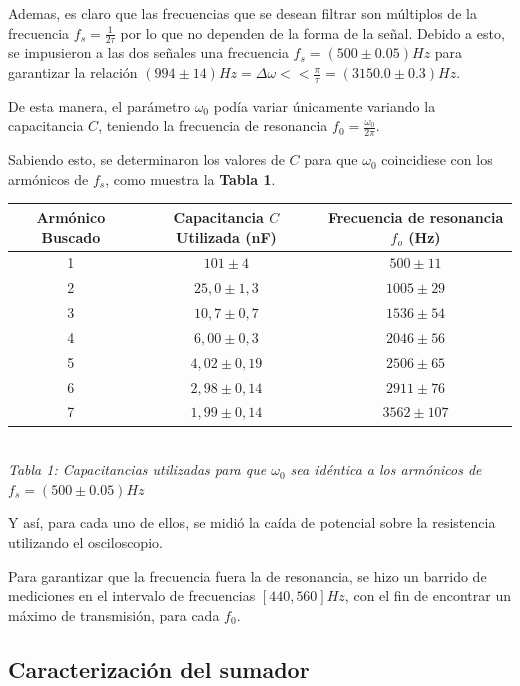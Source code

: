 \documentclass[11pt,a4paper]{article}
\begin{document}
Ademas, es claro que las frecuencias que se desean filtrar son múltiplos de la frecuencia $f_s = \frac{1}{2\tau}$ por lo que no dependen de la forma de la señal. Debido a esto, se impusieron a las dos señales una frecuencia $f_s = (500 \pm 0.05) Hz$ para garantizar la relación $(994\pm 14)Hz=\Delta\omega << \frac{\pi}{\tau} = (3150.0 \pm 0.3)Hz$.

De esta manera, el parámetro $\omega_0$ podía variar únicamente variando la capacitancia $C$, teniendo la frecuencia de resonancia $f_0= \frac{\omega_0}{2\pi}$.

Sabiendo esto, se determinaron los valores de $C$ para que $\omega_0$ coincidiese con los armónicos de $f_s$, como muestra la \textbf{Tabla 1}.

\begin{center}

\begin{tabular}{||c|c|c||}
\hline 
\textbf{Armónico Buscado} & \textbf{Capacitancia $C$ Utilizada (nF)} & \textbf{Frecuencia de resonancia $f_o$ (Hz)} \\ \hline 
 1 & $101 \pm 4$ & $500 \pm 11$ \\ \hline 
 2 & $25,0 \pm 1,3$ & $1005 \pm 29$ \\ \hline 
 3 & $10,7 \pm 0,7$ & $1536 \pm 54$ \\ \hline 
 4 & $6,00 \pm 0,3$ & $2046 \pm 56$ \\ \hline 
 5 & $4,02 \pm 0,19$ & $2506 \pm 65$ \\ \hline 
 6 & $2,98 \pm 0,14$ & $2911 \pm 76$ \\ \hline 
 7 & $1,99 \pm 0,14$ & $3562 \pm 107$ \\ \hline
\end{tabular}
\\[0.3cm] 
\textit{Tabla 1: Capacitancias utilizadas para que $\omega_0$ sea idéntica a los armónicos de $f_s = (500 \pm 0.05) Hz$}

\end{center}

 Y así, para cada uno de ellos, se midió la caída de potencial sobre la resistencia utilizando el osciloscopio. 

Para garantizar que la frecuencia fuera la de resonancia, se hizo un barrido de mediciones en el intervalo de frecuencias $[440,560] Hz$, con el fin de encontrar un máximo de transmisión, para cada $f_0$.


\subsection{Caracterización del sumador}
\end{document}
